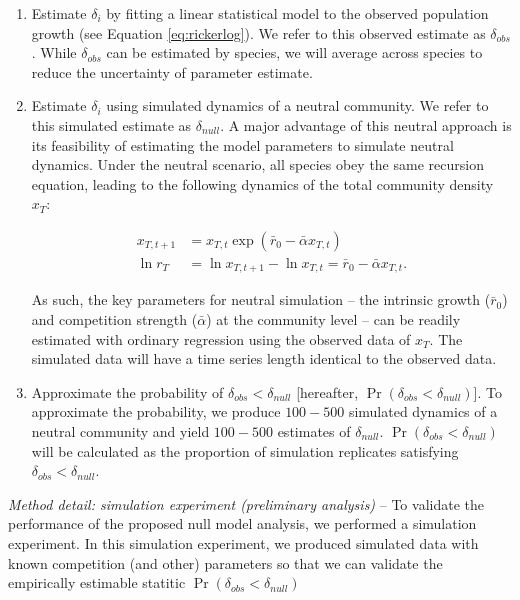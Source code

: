 \documentclass[12pt, class=article, crop=false]{standalone}
\begin{document}
\begin{enumerate}
    \item Estimate $\delta_i$ by fitting a linear statistical model to the observed population growth (see Equation \ref{eq:rickerlog}). We refer to this observed estimate as $\delta_{obs}$. While $\delta_{obs}$ can be estimated by species, we will average across species to reduce the uncertainty of parameter estimate.
    
    \item Estimate $\delta_i$ using simulated dynamics of a neutral community.
    We refer to this simulated estimate as $\delta_{null}$.
    A major advantage of this neutral approach is its feasibility of estimating the model parameters to simulate neutral dynamics. 
    Under the neutral scenario, all species obey the same recursion equation, leading to the following dynamics of the total community density $x_T$:

    \begin{align}
        \label{}
        x_{T, t+1} &= x_{T, t} \exp(\bar{r}_0 - \bar{\alpha} x_{T, t})\\
        \ln r_T &= \ln {x_{T, t+1}} - \ln {x_{T, t}} = \bar{r}_0 - \bar{\alpha} x_{T, t}.
    \end{align}

    As such, the key parameters for neutral simulation -- the intrinsic growth ($\bar{r}_0$) and competition strength ($\bar{\alpha}$) at the community level -- can be readily estimated with ordinary regression using the observed data of $x_T$.
    The simulated data will have a time series length identical to the observed data. 
    
    \item Approximate the probability of $\delta_{obs} < \delta_{null}$ [hereafter, $\Pr(\delta_{obs} < \delta_{null})$]. To approximate the probability, we produce $100 - 500$ simulated dynamics of a neutral community and yield $100 - 500$ estimates of $\delta_{null}$. $\Pr(\delta_{obs} < \delta_{null})$ will be calculated as the proportion of simulation replicates satisfying $\delta_{obs} < \delta_{null}$.
\end{enumerate}

\textit{Method detail: simulation experiment (preliminary analysis)} --
To validate the performance of the proposed null model analysis, we performed a simulation experiment. In this simulation experiment, we produced simulated data with known competition (and other) parameters so that we can validate the empirically estimable statitic $\Pr(\delta_{obs} < \delta_{null})$ 
\end{document}
